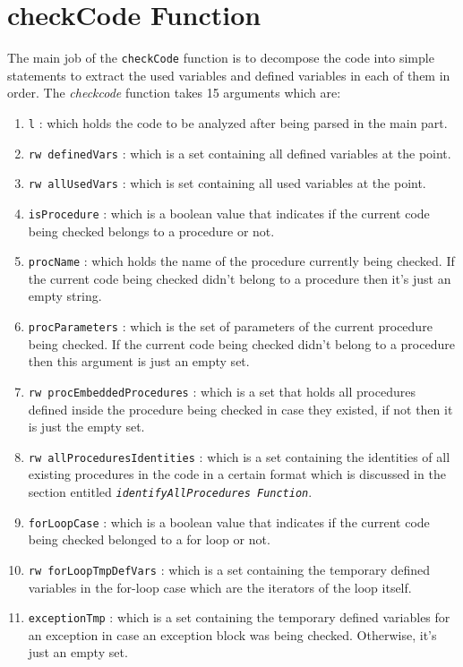 \documentclass[11pt]{report}
\begin{document}
\section{checkCode Function}
The main job of the \texttt{checkCode} function is to decompose the code into simple statements to extract the used variables and defined variables in each of them in order.
The \textsl{checkcode} function takes 15 arguments which are:
\begin{enumerate}
\item \texttt{l} : which holds the code to be analyzed after being parsed in the main part.
\item \texttt{rw definedVars} : which is a set containing all defined variables at the point.
\item \texttt{rw allUsedVars} : which is set containing all used variables at the point.
\item \texttt{isProcedure} : which is a boolean value that indicates if the current code being checked belongs to a procedure or not.
\item \texttt{procName} : which holds the name of the procedure currently being checked. If the current code being checked didn't belong to a procedure then it's just an empty string. 
\item \texttt{procParameters} : which is the set of parameters of the current procedure being checked. If the current code being checked didn't belong to a procedure then this argument is just an empty set.
\item \texttt{rw procEmbeddedProcedures} : which is a set that holds all procedures defined inside the procedure being checked in case they existed, if not then it is just the empty set.
\item \texttt{rw allProceduresIdentities} : which is a set containing the identities of all existing procedures in the code in a certain format which is discussed in the section entitled \texttt{\textsl{identifyAllProcedures Function}}.
\item \texttt{forLoopCase} : which is a boolean value that indicates if the current code being checked belonged to a for loop or not.
\item \texttt{rw forLoopTmpDefVars} : which is a set containing the temporary defined variables in the for-loop case which are the iterators of the loop itself.
\item \texttt{exceptionTmp} : which is a set containing the temporary defined variables for an exception in case an exception block was being checked. Otherwise, it's just an empty set.

\end{enumerate}
\end{document}
